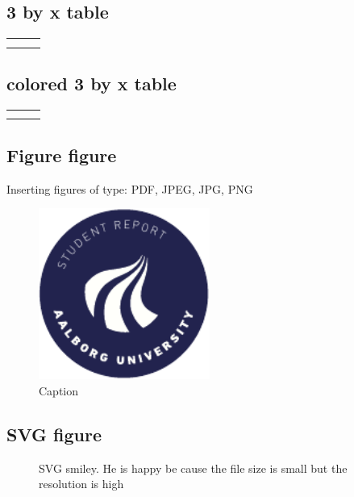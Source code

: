 \subsection{3 by x table}
\begin{table}[H]
\begin{tabular}{|l|l|l|}
\hline

        &       &       \\ \hline
        &       &       \\ \hline
        &       &       \\ \hline
\end{tabular}
\end{table}
\subsection{colored 3 by x table}
\begin{table}[H]
\begin{tabular}{|l|l|l|}
\hline
 
&  &  \\ \hline
 &  &  \\ \hline
 &  &  \\ \hline
\end{tabular}
\end{table}

\subsection{Figure figure}
Inserting figures of type: PDF, JPEG, JPG, PNG
\begin{figure}[H]
    \centering
    \includegraphics[width=0.5\textwidth]{aaugraphics/aau_logo_circle_en.pdf}
    \caption{Caption}
    \label{fig:enter_label2}
\end{figure}

\subsection{SVG figure}
\begin{figure}[H]
    \centering
    
    \caption{ SVG smiley. He is happy be cause the file size is small but the resolution is high}
    \label{fig:enter_label1}
\end{figure}

